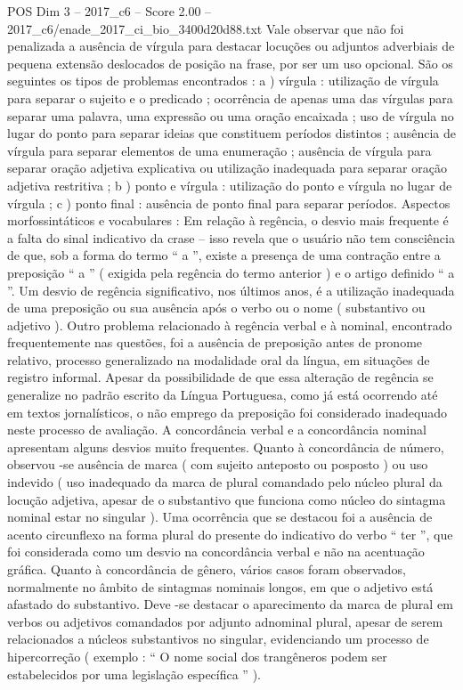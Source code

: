 \begin{textsample}{POS Dim 3 – 2017\_c6 – Score 2.00 – 2017\_c6/enade\_2017\_ci\_bio\_3400d20d88.txt}
Vale observar que não foi penalizada a ausência de vírgula para destacar locuções ou adjuntos adverbiais de pequena extensão deslocados de posição na frase, por ser um uso opcional.
São os seguintes os tipos de problemas encontrados : a ) vírgula : utilização de vírgula para separar o sujeito e o predicado ; ocorrência de apenas uma das vírgulas para separar uma palavra, uma expressão ou uma oração encaixada ; uso de vírgula no lugar do ponto para separar ideias que constituem períodos distintos ; ausência de vírgula para separar elementos de uma enumeração ; ausência de vírgula para separar oração adjetiva explicativa ou utilização inadequada para separar oração adjetiva restritiva ; b ) ponto e vírgula : utilização do ponto e vírgula no lugar de vírgula ; c ) ponto final : ausência de ponto final para separar períodos.
Aspectos morfossintáticos e vocabulares : Em relação à regência, o desvio mais frequente é a falta do sinal indicativo da crase – isso revela que o usuário não tem consciência de que, sob a forma do termo “ a ”, existe a presença de uma contração entre a preposição “ a ” ( exigida pela regência do termo anterior ) e o artigo definido “ a ”.
Um desvio de regência significativo, nos últimos anos, é a utilização inadequada de uma preposição ou sua ausência após o verbo ou o nome ( substantivo ou adjetivo ).
Outro problema relacionado à regência verbal e à nominal, encontrado frequentemente nas questões, foi a ausência de preposição antes de pronome relativo, processo generalizado na modalidade oral da língua, em situações de registro informal.
Apesar da possibilidade de que essa alteração de regência se generalize no padrão escrito da Língua Portuguesa, como já está ocorrendo até em textos jornalísticos, o não emprego da preposição foi considerado inadequado neste processo de avaliação.
A concordância verbal e a concordância nominal apresentam alguns desvios muito frequentes.
Quanto à concordância de número, observou -se ausência de marca ( com sujeito anteposto ou posposto ) ou uso indevido ( uso inadequado da marca de plural comandado pelo núcleo plural da locução adjetiva, apesar de o substantivo que funciona como núcleo do sintagma nominal estar no singular ).
Uma ocorrência que se destacou foi a ausência de acento circunflexo na forma plural do presente do indicativo do verbo “ ter ”, que foi considerada como um desvio na concordância verbal e não na acentuação gráfica.
Quanto à concordância de gênero, vários casos foram observados, normalmente no âmbito de sintagmas nominais longos, em que o adjetivo está afastado do substantivo.
Deve -se destacar o aparecimento da marca de plural em verbos ou adjetivos comandados por adjunto adnominal plural, apesar de serem relacionados a núcleos substantivos no singular, evidenciando um processo de hipercorreção ( exemplo : “ O nome social dos trangêneros podem ser estabelecidos por uma legislação específica ” ).

\end{textsample}
